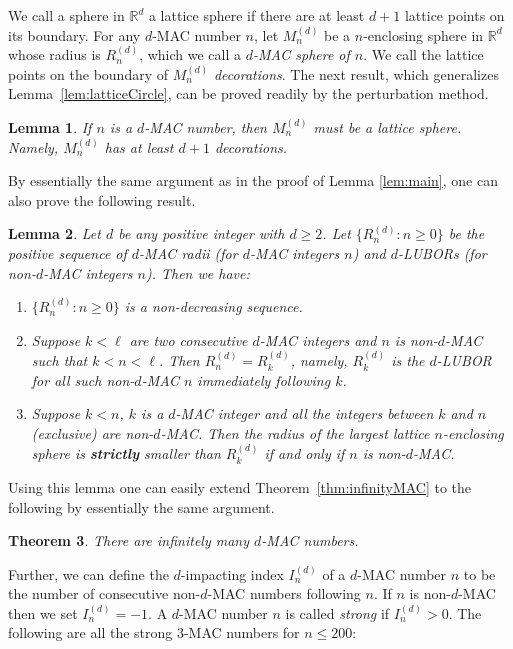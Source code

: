 \documentclass{article}
\theoremstyle{theorem}
\newtheorem{theorem}{Theorem}
\newtheorem{lemma}[theorem]{Lemma}
\theoremstyle{definition}
\begin{document}
We call a sphere in ${\mathbb R}^d$ a lattice sphere if there are at least $d+1$ lattice points on its boundary.
For any $d$-MAC number $n$, let $M_n^{(d)}$ be a $n$-enclosing sphere in ${\mathbb R}^d$ whose radius is $R_n^{(d)}$, which we call a \emph{$d$-MAC sphere of $n$}. We call the lattice points on the boundary of $M_n^{(d)}$ \emph{decorations}. The next result, which generalizes Lemma~\ref{lem:latticeCircle}, can be proved readily by the perturbation method.

\begin{lemma}\label{lem:Lattice-d-MAC}
If $n$ is a $d$-MAC number, then $M_n^{(d)}$ must be a lattice sphere. Namely, $M_n^{(d)}$ has at least $d+1$ decorations.
\end{lemma}

By essentially the same argument as in the proof of Lemma \ref{lem:main}, one can also prove the following result.
\begin{lemma}\label{lem:main-d}
Let $d$ be any positive integer with $d\ge 2$. Let $\{R_n^{(d)}: n\ge 0\}$ be the positive sequence of $d$-MAC radii (for $d$-MAC integers $n$)
and $d$-LUBORs (for non-$d$-MAC integers $n$). Then we have:
\begin{enumerate}
  \item[(a)] $\{R_n^{(d)}: n\ge 0\}$ is a non-decreasing sequence.

  \item[(b)] Suppose $k<\ell$ are two consecutive $d$-MAC integers and $n$ is non-$d$-MAC such that $k<n<\ell$. Then $R_n^{(d)}=R_k^{(d)}$, namely, $R_k^{(d)}$ is the $d$-LUBOR for all such non-$d$-MAC $n$ immediately following $k$.

  \item[(c)] Suppose $k<n$, $k$ is a $d$-MAC integer and all the integers between $k$ and $n$ (exclusive) are non-$d$-MAC. Then the radius of the largest lattice $n$-enclosing sphere is \textbf{strictly} smaller than $R_k^{(d)}$ if and only if $n$ is non-$d$-MAC.
\end{enumerate}
\end{lemma}

Using this lemma one can easily extend Theorem~\ref{thm:infinityMAC} to the following by essentially the same argument.

\begin{theorem}\label{thm:infinity-d-MAC}
There are infinitely many $d$-MAC numbers.
\end{theorem}

Further, we can define the $d$-impacting index $I_n^{(d)}$ of a $d$-MAC number $n$ to be the number of consecutive non-$d$-MAC numbers following $n$. If $n$ is non-$d$-MAC then we set $I_n^{(d)}=-1.$ A $d$-MAC number $n$ is called \emph{strong} if $I_n^{(d)}>0$. The following are all the strong $3$-MAC numbers for $n\le 200$:
\end{document}
